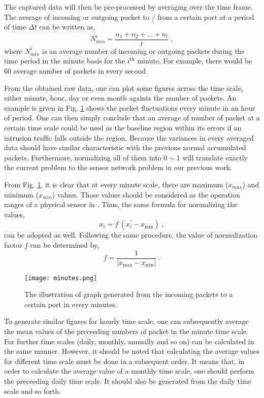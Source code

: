 \documentclass[conference,10pt,a4paper]{IEEEtran}
\begin{document}
The  captured data will then be pre-processed by averaging over the time frame. The average of incoming or outgoing packet to / from a certain port at a period of time $\Delta t$ can be written as,
\begin{equation}
  N_{min}^{i} = \frac{n_{1} + n_{2} + \ldots + n_{t}}{t} \; ,
  \label{eq:Nminute}
\end{equation}
where $N_{min}^{i}$ is an average number of incoming or outgoing packets during the time period in the minute basis for the $i^\mathrm{th}$ minute. 
For example, there would be $60$ average number of packets in every second.

From the obtained raw data, one can plot some figures across the time scale, either minute, hour, day or even month againts the number of packets. An example is given in Fig. \ref{fig:minutes} shows the packet fluctuations every minute in an hour of period. One can then simply conclude that an average of number of packet at a certain time scale could be used as the baseline region within its errors if an intrusion traffic falls outside the region. Because the variances in every averaged data should have similar characteristic with the previous normal accumulated packets. Furthermore, normalizing all of them into $0 \sim 1$ will translate exactly the current problem to the sensor network problem in our previous work. 

From Fig. \ref{fig:minutes}, it is clear that at every minute scale, there are maximum ($x_{max}$) and minimum ($x_{min}$) values. Those values should be considered as the operation ranges of a physical sensor in \cite{arya}. Thus, the same formula for normalizing the values,
\begin{equation}
  x_i = f \, \left( x^\prime_i - x_\mathrm{min} \right) \; ,
  \label{eq:normalizing}
\end{equation}
can be adopted as well. Following the same procedure, the value of normalization factor $f$ can be determined by,
\begin{equation}
  f = \frac{1}{\left| x_\mathrm{max} - x_\mathrm{min} \right|} \; .
  \label{eq.normFactor} 
\end{equation}

\begin{figure}[t!]
 \centering
 \texttt{[image: minutes.png]}
\caption{The illustration of graph generated from the incoming packets to a certain port in every minutes.}
\label{fig:minutes}
\end{figure}

To generate similar figures for hourly time scale, one can subsequently average the mean values of the preceeding numbers of packet in the minute time scale. For further time scales (daily, monthly, annually and so on) can be calculated in the same manner. However, it should be noted that calculating the average values for different time scale must be done in a subsequent order. It means that, in order to calculate the average value of a monthly time scale, one should perform the preceeding daily time scale. It should also be generated from the daily time scale and so forth.
\end{document}
